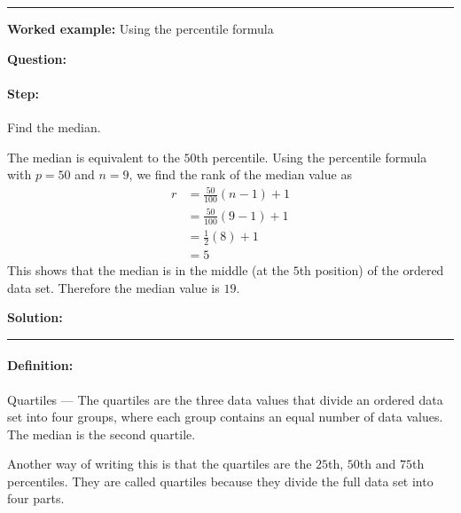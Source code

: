 \documentclass[a4paper,11pt]{report}
\def\Definition#1#2{\paragraph{Definition:} #1 --- #2}
\newenvironment{wex}[3]%
{\rule{\linewidth}{0.5mm}
\textbf{Worked example:} #1

\textbf{Question:} #2

\textbf{Solution:} #3}%
{\rule{\linewidth}{0.5mm}}
\newcommand{\westep}[1]{\paragraph{Step:} #1}
\begin{document}
\begin{wex}{Using the percentile formula}
{    \westep{Find the median.}

    The median is equivalent to the $50$th percentile. Using the
    percentile formula with $p=50$ and $n=9$, we find the rank of the
    median value as
    \begin{align}
      r &= \frac{50}{100}\left(n-1\right)+1 \\
        &= \frac{50}{100}\left(9-1\right)+1 \\
        &= \frac{1}{2}(8)+1 \\
        &= 5
    \end{align}
    This shows that the median is in the middle (at the $5$th position)
    of the ordered data set. Therefore the median value is $19$. 

}
\end{wex}

\Definition{Quartiles}{The quartiles are the three data values that
  divide an ordered data set into four groups, where each group
  contains an equal number of data values. The median is the second
  quartile.}

Another way of writing this is that the quartiles are the $25$th, $50$th
and $75$th percentiles. They are called quartiles because they divide
the full data set into four parts.
\end{document}
